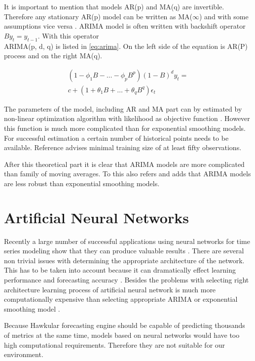     It is important to mention that models AR(p) and MA(q) are invertible. Therefore any stationary AR(p) model can
    be written as MA($\infty$) and with some assumptions vice versa \cite{brockwell}. ARIMA model is often written
    with backshift operator $By_t=y_{t-1}$. With this operator \\ARIMA(p, d, q) is listed in \ref{eq:arima}. On the
    left side of the equation is AR(P) process and on the right MA(q).

    \begin{gather} \label{eq:arima}
        (1- \phi_1B - \dots - \phi_pB^p)(1-B)^d y_t = \\ \nonumber
         c + (1+\theta_1B+\dots+\theta_qB^q) \epsilon_t
    \end{gather}

    The parameters of the model, including AR and MA part can by estimated by non-linear optimization algorithm
    with likelihood as objective function \cite{brockwell}. However this function is much more complicated than for
    exponential smoothing models. For successful estimation a certain number of historical points needs to
    be available. Reference \cite{cipra} advises minimal training size of at least fifty observations.

    After this theoretical part it is clear that ARIMA models are more complicated than family of moving averages.
    To this also refers \cite{hyndman-forecasting} and adds that ARIMA models are less robust than exponential
    smoothing models.

    \section{Artificial Neural Networks} \label{sec:ann}
    Recently a large number of successful applications using neural networks for time series modeling show that they
    can produce valuable results \cite{ann-forecasting-state-art}. There are several non trivial issues with
    determining the appropriate architecture of the network. This has to be taken into account because it can
    dramatically effect learning performance and forecasting accuracy \cite{ann-model-selecting}.
    Besides the problems with selecting right architecture learning process of artificial neural network is much more
    computationally expensive than selecting appropriate ARIMA or exponential smoothing model \cite{ann-forecasting}.

    Because Hawkular forecasting engine should be capable of predicting thousands of metrics at the same time, models
    based on neural networks would have too high computational requirements. Therefore they are not suitable for our
    environment.

